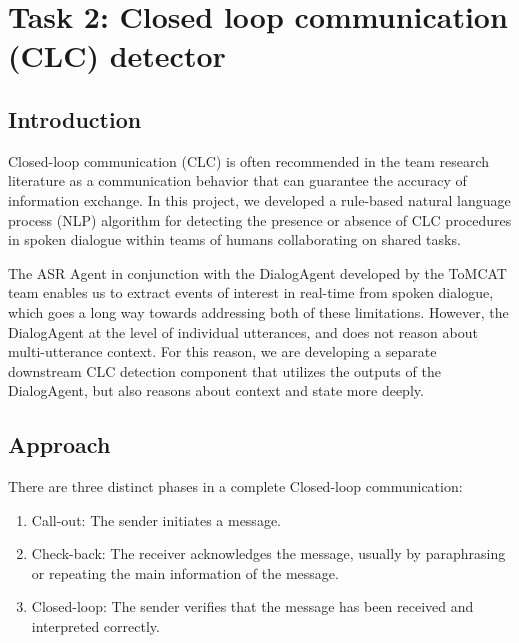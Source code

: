\section{Task 2: Closed loop communication (CLC) detector}
\subsection{Introduction}

Closed-loop communication (CLC) is often recommended in the team research
literature as a communication behavior that can guarantee the accuracy of
information exchange. In this project, we developed a rule-based natural
language process (NLP) algorithm for detecting the presence or absence of CLC
procedures in spoken dialogue within teams of humans collaborating on shared
tasks.

The ASR Agent in conjunction with the DialogAgent developed by the ToMCAT team
enables us to extract events of interest in real-time from spoken dialogue,
which goes a long way towards addressing both of these limitations. However,
the DialogAgent at the level of individual utterances, and does not reason
about multi-utterance context. For this reason, we are developing a separate
downstream CLC detection component that utilizes the outputs of the
DialogAgent, but also reasons about context and state more deeply.

\subsection{Approach}

There are three distinct phases in a complete Closed-loop communication:

\begin{enumerate}
    \item Call-out: The sender initiates a message.
    \item Check-back: The receiver acknowledges the message, usually by
        paraphrasing or repeating the main information of the message.
    \item Closed-loop: The sender verifies that the message has been received
        and interpreted correctly.
\end{enumerate}

